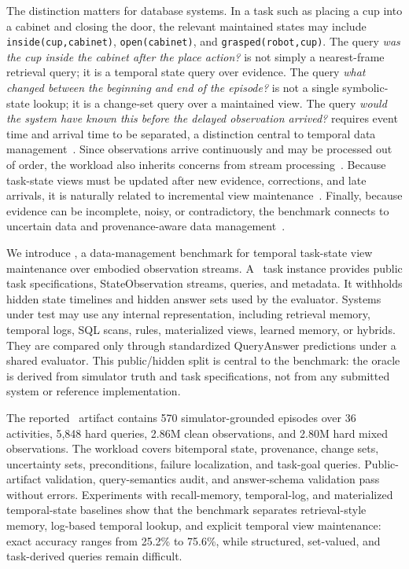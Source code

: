 The distinction matters for database systems. In a task such as placing a cup into a cabinet and closing the door, the relevant maintained states may include \texttt{inside(cup,cabinet)}, \texttt{open(cabinet)}, and \texttt{grasped(robot,cup)}. The query \emph{was the cup inside the cabinet after the place action?} is not simply a nearest-frame retrieval query; it is a temporal state query over evidence. The query \emph{what changed between the beginning and end of the episode?} is not a single symbolic-state lookup; it is a change-set query over a maintained view. The query \emph{would the system have known this before the delayed observation arrived?} requires event time and arrival time to be separated, a distinction central to temporal data management~\cite{snodgrass1999developing,jensen1999temporal}. Since observations arrive continuously and may be processed out of order, the workload also inherits concerns from stream processing~\cite{babcock2002models}. Because task-state views must be updated after new evidence, corrections, and late arrivals, it is naturally related to incremental view maintenance~\cite{gupta1995maintenance,zhuge1995view}. Finally, because evidence can be incomplete, noisy, or contradictory, the benchmark connects to uncertain data and provenance-aware data management~\cite{aggarwal2009uncertain,green2007provenance,cheney2009provenance}.

We introduce \bench, a data-management benchmark for temporal task-state view maintenance over embodied observation streams. A \bench\ task instance provides public task specifications, StateObservation streams, queries, and metadata. It withholds hidden state timelines and hidden answer sets used by the evaluator. Systems under test may use any internal representation, including retrieval memory, temporal logs, SQL scans, rules, materialized views, learned memory, or hybrids. They are compared only through standardized QueryAnswer predictions under a shared evaluator. This public/hidden split is central to the benchmark: the oracle is derived from simulator truth and task specifications, not from any submitted system or reference implementation.

The reported \bench\ artifact contains 570 simulator-grounded episodes over 36 activities, 5,848 hard queries, 2.86M clean observations, and 2.80M hard mixed observations. The workload covers bitemporal state, provenance, change sets, uncertainty sets, preconditions, failure localization, and task-goal queries. Public-artifact validation, query-semantics audit, and answer-schema validation pass without errors. Experiments with recall-memory, temporal-log, and materialized temporal-state baselines show that the benchmark separates retrieval-style memory, log-based temporal lookup, and explicit temporal view maintenance: exact accuracy ranges from 25.2\% to 75.6\%, while structured, set-valued, and task-derived queries remain difficult.

